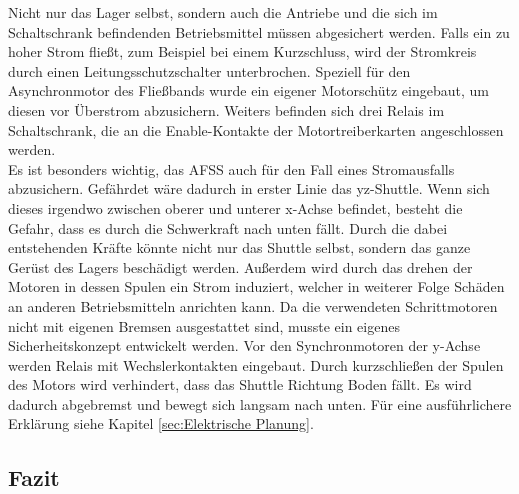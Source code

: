Nicht nur das Lager selbst, sondern auch die Antriebe und die sich im Schaltschrank befindenden Betriebsmittel müssen abgesichert werden. Falls ein zu hoher Strom fließt, zum Beispiel bei einem Kurzschluss, wird der Stromkreis durch einen Leitungsschutzschalter unterbrochen. Speziell für den Asynchronmotor des Fließbands wurde ein eigener Motorschütz eingebaut, um diesen vor Überstrom abzusichern. Weiters befinden sich drei Relais im Schaltschrank, die an die Enable-Kontakte der Motortreiberkarten angeschlossen werden.\\
Es ist besonders wichtig, das AFSS auch für den Fall eines Stromausfalls abzusichern. Gefährdet wäre dadurch in erster Linie das yz-Shuttle. Wenn sich dieses irgendwo zwischen oberer und unterer x-Achse befindet, besteht die Gefahr, dass es durch die Schwerkraft nach unten fällt. Durch die dabei entstehenden Kräfte könnte nicht nur das Shuttle selbst, sondern das ganze Gerüst des Lagers beschädigt werden. Außerdem wird durch das drehen der Motoren in dessen Spulen ein Strom induziert, welcher in weiterer Folge Schäden an anderen Betriebsmitteln anrichten kann. Da die verwendeten Schrittmotoren nicht mit eigenen Bremsen ausgestattet sind, musste ein eigenes Sicherheitskonzept entwickelt werden. Vor den Synchronmotoren der y-Achse werden Relais mit Wechslerkontakten eingebaut. Durch kurzschließen der Spulen des Motors wird verhindert, dass das Shuttle Richtung Boden fällt. Es wird dadurch abgebremst und bewegt sich langsam nach unten. Für eine ausführlichere Erklärung siehe Kapitel \ref{sec:Elektrische Planung}.

\subsection{Fazit}